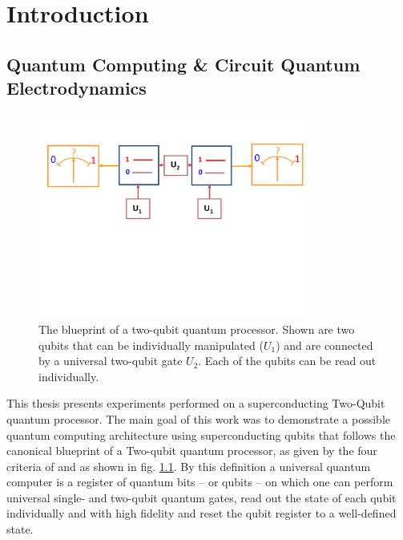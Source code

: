 \chapter{Introduction}


\section{Quantum Computing \& Circuit Quantum Electrodynamics}

\begin{figure}
	\centering
		\includegraphics[width=0.8\textwidth]{./material/papers/grover/submission1/Fig1}
	\caption[Blueprint of a two-qubit quantum processor]{The blueprint of a two-qubit quantum processor. Shown are two qubits that can be individually manipulated ($U_1$) and are connected by a universal two-qubit gate $U_2$. Each of the qubits can be read out individually.}
	\label{fig:qubit_processor_blueprint}
\end{figure}

This thesis presents experiments performed on a superconducting Two-Qubit quantum processor. The main goal of this work was to demonstrate a possible quantum computing architecture using superconducting qubits that follows the canonical blueprint of a Two-qubit quantum processor, as given by the four criteria of \cite{divincenzo_physical_2000} and as shown in fig. \ref{fig:qubit_processor_blueprint}. By this definition a universal quantum computer is a register of quantum bits -- or qubits -- on which one can perform universal single- and two-qubit quantum gates, read out the state of each qubit individually and with high fidelity and reset the qubit register to a well-defined state.

